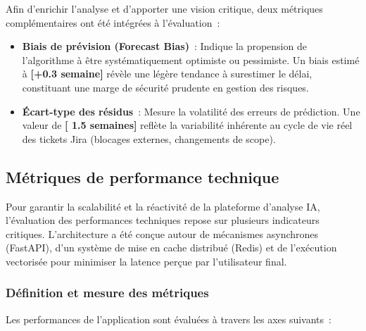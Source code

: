 Afin d'enrichir l'analyse et d'apporter une vision critique, deux métriques complémentaires ont été intégrées à l'évaluation~:

\begin{itemize}
    \renewcommand{\labelitemi}{—}
    \item \textbf{Biais de prévision (Forecast Bias)}~: Indique la propension de l'algorithme à être systématiquement optimiste ou pessimiste. Un biais estimé à \textbf{[+0.3 semaine]} révèle une légère tendance à surestimer le délai, constituant une marge de sécurité prudente en gestion des risques.
    \item \textbf{Écart-type des résidus}~: Mesure la volatilité des erreurs de prédiction. Une valeur de \textbf{[ 1.5 semaines]} reflète la variabilité inhérente au cycle de vie réel des tickets Jira (blocages externes, changements de scope).
\end{itemize}

\subsection{Métriques de performance technique}

Pour garantir la scalabilité et la réactivité de la plateforme d’analyse IA, l’évaluation des performances techniques repose sur plusieurs indicateurs critiques. L’architecture a été conçue autour de mécanismes asynchrones (FastAPI), d’un système de mise en cache distribué (Redis) et de l’exécution vectorisée pour minimiser la latence perçue par l’utilisateur final.

\subsubsection{Définition et mesure des métriques}

Les performances de l’application sont évaluées à travers les axes suivants~:

